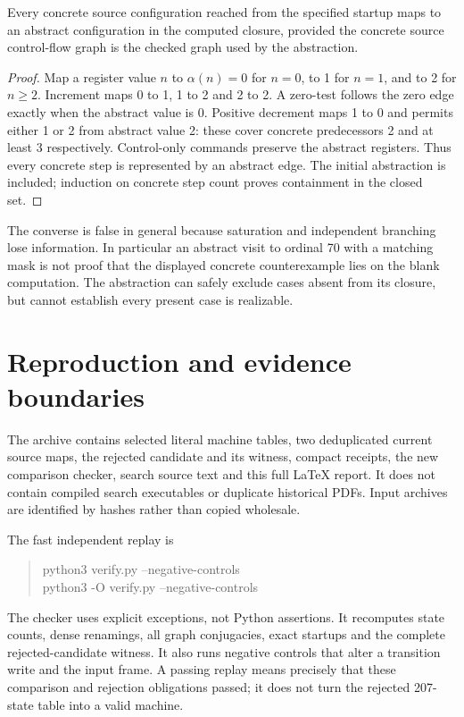 \documentclass[11pt,letterpaper]{article}
\begin{document}
\begin{lemma}
Every concrete source configuration reached from the specified startup maps
to an abstract configuration in the computed closure, provided the concrete
source control-flow graph is the checked graph used by the abstraction.
\end{lemma}
\begin{proof}
Map a register value $n$ to $\alpha(n)=0$ for $n=0$, to 1 for $n=1$, and to 2
for $n\geq2$. Increment maps $0$ to 1, 1 to 2 and 2 to 2. A zero-test follows
the zero edge exactly when the abstract value is 0. Positive decrement maps
1 to 0 and permits either 1 or 2 from abstract value 2: these cover concrete
predecessors 2 and at least 3 respectively. Control-only commands preserve
the abstract registers. Thus every concrete step is represented by an
abstract edge. The initial abstraction is included; induction on concrete
step count proves containment in the closed set.
\end{proof}

The converse is false in general because saturation and independent branching
lose information. In particular an abstract visit to ordinal 70 with a
matching mask is not proof that the displayed concrete counterexample lies
on the blank computation. The abstraction can safely exclude cases absent
from its closure, but cannot establish every present case is realizable.



\section{Reproduction and evidence boundaries}
The archive contains selected literal machine tables, two deduplicated current
source maps, the rejected candidate and its witness, compact receipts, the new
comparison checker, search source text and this full \LaTeX{} report. It does
not contain compiled search executables or duplicate historical PDFs. Input
archives are identified by hashes rather than copied wholesale.

The fast independent replay is
\begin{quote}\ttfamily
python3 verify.py --negative-controls\\
python3 -O verify.py --negative-controls
\end{quote}
The checker uses explicit exceptions, not Python assertions. It recomputes
state counts, dense renamings, all graph conjugacies, exact startups and the
complete rejected-candidate witness. It also runs negative controls that
alter a transition write and the input frame. A passing replay means precisely
that these comparison and rejection obligations passed; it does not turn the
rejected 207-state table into a valid machine.
\end{document}
